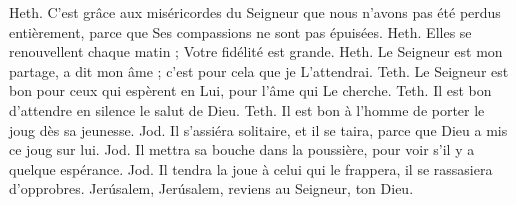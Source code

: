 Heth. C'est grâce aux miséricordes du Seigneur que nous n'avons pas été perdus entièrement, parce que Ses compassions ne sont pas épuisées.
\versseparator
Heth. Elles se renouvellent chaque matin ; Votre fidélité est grande.
\versseparator
Heth. Le Seigneur est mon partage, a dit mon âme ; c'est pour cela que je L'attendrai.
\versseparator
Teth. Le Seigneur est bon pour ceux qui espèrent en Lui, pour l'âme qui Le cherche.
\versseparator
Teth. Il est bon d'attendre en silence le salut de Dieu.
\versseparator
Teth. Il est bon à l'homme de porter le joug dès sa jeunesse.
\versseparator
Jod. Il s'assiéra solitaire, et il se taira, parce que Dieu a mis ce joug sur lui.
\versseparator
Jod. Il mettra sa bouche dans la poussière, pour voir s'il y a quelque espérance.
\versseparator
Jod. Il tendra la joue à celui qui le frappera, il se rassasiera d'opprobres.
\versseparator
Jerúsalem, Jerúsalem, reviens au Seigneur, ton Dieu.